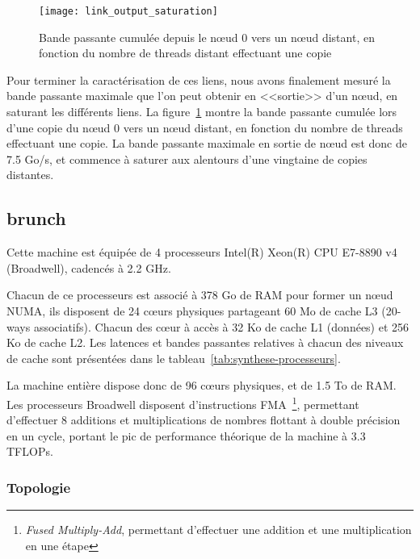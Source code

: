 \begin{figure}[ht]
  \centering
  \texttt{[image: link\_output\_saturation]}
  \caption{Bande passante cumulée depuis le nœud 0 vers un nœud distant, en fonction du nombre de threads distant effectuant une copie}\label{fig:contribs:machines:idchire:saturation-output}
\end{figure}

Pour terminer la caractérisation de ces liens, nous avons finalement mesuré la bande passante maximale que l'on peut obtenir en <<sortie>> d'un nœud, en saturant les différents liens.
La figure~\ref{fig:contribs:machines:idchire:saturation-output} montre la bande passante cumulée lors d'une copie du nœud 0 vers un nœud distant, en fonction du nombre de threads effectuant une copie.
La bande passante maximale en sortie de nœud est donc de 7.5 Go/s, et commence à saturer aux alentours d'une vingtaine de copies distantes.



\subsection{brunch}\label{sec:contribs:machines:brunch}

Cette machine est équipée de 4 processeurs Intel(R) Xeon(R) CPU E7-8890 v4 (Broadwell), cadencés à 2.2 GHz.

Chacun de ce processeurs est associé à 378 Go de RAM pour former un nœud NUMA, ils disposent de 24 cœurs physiques partageant 60 Mo de cache L3 (20-ways associatifs).
Chacun des cœur à accès à 32 Ko de cache L1 (données) et 256 Ko de cache L2.
Les latences et bandes passantes relatives à chacun des niveaux de cache sont présentées dans le tableau~\ref{tab:synthese-processeurs}.

La machine entière dispose donc de 96 cœurs physiques, et de 1.5 To de RAM.
Les processeurs Broadwell disposent d'instructions FMA~\footnote{\emph{Fused Multiply-Add}, permettant d'effectuer une addition et une multiplication en une étape}, permettant d'effectuer 8 additions et multiplications de nombres flottant à double précision en un cycle, portant le pic de performance théorique de la machine à 3.3 TFLOPs.


\subsubsection{Topologie}

